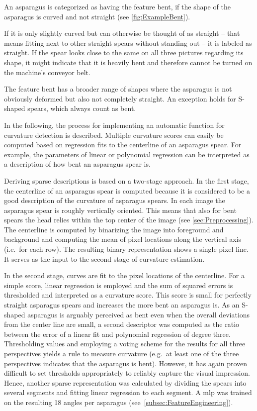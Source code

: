 \bigskip
An asparagus is categorized as having the feature bent, if the shape of the asparagus is curved and not straight (see \autoref{fig:ExampleBent}). 

If it is only slightly curved but can otherwise be thought of as straight -- that means fitting next to other straight spears without standing out -- it is labeled as straight. If the spear looks close to the same on all three pictures regarding its shape, it might indicate that it is heavily bent and therefore cannot be turned on the machine’s conveyor belt.

The feature bent has a broader range of shapes where the asparagus is not obviously deformed but also not completely straight. An exception holds for S-shaped spears, which always count as bent.

\bigskip
In the following, the process for implementing an automatic function for curvature detection is described.
Multiple curvature scores can easily be computed based on regression fits to the centerline of an asparagus spear. For example, the parameters of linear or polynomial regression can be interpreted as a description of how bent an asparagus spear is. 

\bigskip
Deriving sparse descriptions is based on a two-stage approach. In the first stage, the centerline of an asparagus spear is computed because it is considered to be a good description of the curvature of asparagus spears. In each image the asparagus spear is roughly vertically oriented. This means that also for bent spears the head relies within the top center of the image (see \autoref{sec:Preprocessing}). The centerline is computed by binarizing the image into foreground and background and computing the mean of pixel locations along the vertical axis (i.e.\ for each row). The resulting binary representation shows a single pixel line. It serves as the input to the second stage of curvature estimation.

In the second stage, curves are fit to the pixel locations of the centerline. For a simple score, linear regression is employed and the sum of squared errors is thresholded and interpreted as a curvature score. This score is small for perfectly straight asparagus spears and increases the more bent an asparagus is. As an S-shaped asparagus is arguably perceived as bent even when the overall deviations from the center line are small, a second descriptor was computed as the ratio between the error of a linear fit and polynomial regression of degree three. Thresholding values and employing a voting scheme for the results for all three perspectives yields a rule to measure curvature (e.g.\ at least one of the three perspectives indicates that the asparagus is bent). However, it has again proven difficult to set thresholds appropriately to reliably capture the visual impression. Hence, another sparse representation was calculated by dividing the spears into several segments and fitting linear regression to each segment. A \acrfull{mlp} was trained on the resulting 18 angles per asparagus (see~\autoref{subsec:FeatureEngineering}).

